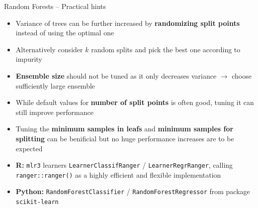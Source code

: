 \begin{frame}{Random Forests -- Practical hints}

\begin{itemize}
    \item Variance of trees can be further increased by \textbf{randomizing split points} instead of using the optimal one
    \item Alternatively consider $k$ random splits and pick the best one according to impurity 
\end{itemize}

\medskip

\begin{itemize}
    \item \textbf{Ensemble size} should not be tuned as it only decreases variance $\longrightarrow$ choose sufficiently large ensemble
    \item While default values for \textbf{number of split points} is often good, tuning it can still improve performance
    \item Tuning the \textbf{minimum samples in leafs} and \textbf{minimum samples for splitting} can be benificial but no huge performance increases are to be expected 
\end{itemize}

\medskip


\begin{itemize}
  \item \textbf{R:} \texttt{mlr3} learners \texttt{LearnerClassifRanger} / 
    \texttt{LearnerRegrRanger}, calling \texttt{ranger::ranger()} as a highly efficient and flexible implementation
  \item \textbf{Python:} \texttt{RandomForestClassifier} / 
  \texttt{RandomForestRegressor} from package \texttt{scikit-learn}
\end{itemize}

\end{frame}



